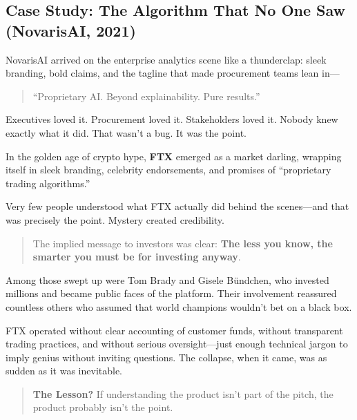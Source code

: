 \subsection{Case Study: The Algorithm That No One Saw (NovarisAI, 2021)}

NovarisAI arrived on the enterprise analytics scene like a thunderclap: sleek branding, bold claims, and the tagline that made procurement teams lean in—

\begin{quote}
“Proprietary AI. Beyond explainability. Pure results.”
\end{quote}

Executives loved it. Procurement loved it. Stakeholders loved it. Nobody knew exactly what it did.  That wasn’t a bug. It was the point.

\begin{tcolorbox}[colback=blue!5!white, colframe=blue!50!black, breakable,
  title={Historical Sidebar: When Mystery Outsells Reality --- The FTX Collapse}]

In the golden age of crypto hype, \textbf{FTX} emerged as a market darling, wrapping itself in sleek branding, celebrity endorsements, and promises of ``proprietary trading algorithms.''

\medskip

Very few people understood what FTX actually did behind the scenes—and that was precisely the point.  Mystery created credibility.

\medskip

\begin{quote}
The implied message to investors was clear: \textbf{The less you know, the smarter you must be for investing anyway}.
\end{quote}

\medskip

Among those swept up were Tom Brady and Gisele Bündchen, who invested millions and became public faces of the platform.  Their involvement reassured countless others who assumed that world champions wouldn’t bet on a black box.

\medskip

FTX operated without clear accounting of customer funds, without transparent trading practices, and without serious oversight—just enough technical jargon to imply genius without inviting questions.  The collapse, when it came, was as sudden as it was inevitable.

\medskip

\begin{quote}
\textbf{The Lesson?} If understanding the product isn't part of the pitch, the product probably isn't the point.
\end{quote}

\end{tcolorbox}


